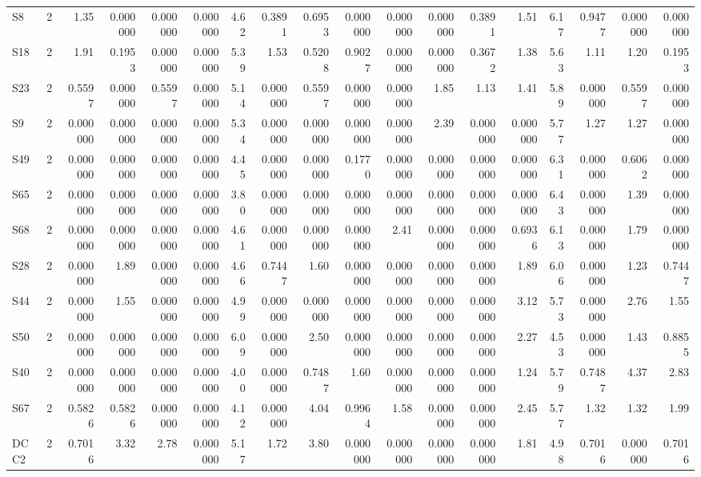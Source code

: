 {\begin{longtable}{lrrrrrrrrrrrrrrrrr}
  S8 & 2 & 1.35 & 0.000000 & 0.000000 & 0.000000 & 4.62 & 0.3891 & 0.6953 & 0.000000 & 0.000000 & 0.000000 & 0.3891 & 1.51 & 6.17 & 0.9477 & 0.000000 & 0.000000 \\
  S18 & 2 & 1.91 & 0.1953 & 0.000000 & 0.000000 & 5.39 & 1.53 & 0.5208 & 0.9027 & 0.000000 & 0.000000 & 0.3672 & 1.38 & 5.63 & 1.11 & 1.20 & 0.1953 \\
  S23 & 2 & 0.5597 & 0.000000 & 0.5597 & 0.000000 & 5.14 & 0.000000 & 0.5597 & 0.000000 & 0.000000 & 1.85 & 1.13 & 1.41 & 5.89 & 0.000000 & 0.5597 & 0.000000 \\
  S9 & 2 & 0.000000 & 0.000000 & 0.000000 & 0.000000 & 5.34 & 0.000000 & 0.000000 & 0.000000 & 0.000000 & 2.39 & 0.000000 & 0.000000 & 5.77 & 1.27 & 1.27 & 0.000000 \\
  S49 & 2 & 0.000000 & 0.000000 & 0.000000 & 0.000000 & 4.45 & 0.000000 & 0.000000 & 0.1770 & 0.000000 & 0.000000 & 0.000000 & 0.000000 & 6.31 & 0.000000 & 0.6062 & 0.000000 \\
  S65 & 2 & 0.000000 & 0.000000 & 0.000000 & 0.000000 & 3.80 & 0.000000 & 0.000000 & 0.000000 & 0.000000 & 0.000000 & 0.000000 & 0.000000 & 6.43 & 0.000000 & 1.39 & 0.000000 \\
  S68 & 2 & 0.000000 & 0.000000 & 0.000000 & 0.000000 & 4.61 & 0.000000 & 0.000000 & 0.000000 & 2.41 & 0.000000 & 0.000000 & 0.6936 & 6.13 & 0.000000 & 1.79 & 0.000000 \\
  S28 & 2 & 0.000000 & 1.89 & 0.000000 & 0.000000 & 4.66 & 0.7447 & 1.60 & 0.000000 & 0.000000 & 0.000000 & 0.000000 & 1.89 & 6.06 & 0.000000 & 1.23 & 0.7447 \\
  S44 & 2 & 0.000000 & 1.55 & 0.000000 & 0.000000 & 4.99 & 0.000000 & 0.000000 & 0.000000 & 0.000000 & 0.000000 & 0.000000 & 3.12 & 5.73 & 0.000000 & 2.76 & 1.55 \\
  S50 & 2 & 0.000000 & 0.000000 & 0.000000 & 0.000000 & 6.09 & 0.000000 & 2.50 & 0.000000 & 0.000000 & 0.000000 & 0.000000 & 2.27 & 4.53 & 0.000000 & 1.43 & 0.8855 \\
  S40 & 2 & 0.000000 & 0.000000 & 0.000000 & 0.000000 & 4.00 & 0.000000 & 0.7487 & 1.60 & 0.000000 & 0.000000 & 0.000000 & 1.24 & 5.79 & 0.7487 & 4.37 & 2.83 \\
  S67 & 2 & 0.5826 & 0.5826 & 0.000000 & 0.000000 & 4.12 & 0.000000 & 4.04 & 0.9964 & 1.58 & 0.000000 & 0.000000 & 2.45 & 5.77 & 1.32 & 1.32 & 1.99 \\
  DCC2 & 2 & 0.7016 & 3.32 & 2.78 & 0.000000 & 5.17 & 1.72 & 3.80 & 0.000000 & 0.000000 & 0.000000 & 0.000000 & 1.81 & 4.98 & 0.7016 & 0.000000 & 0.7016 \\

\end{longtable}}
